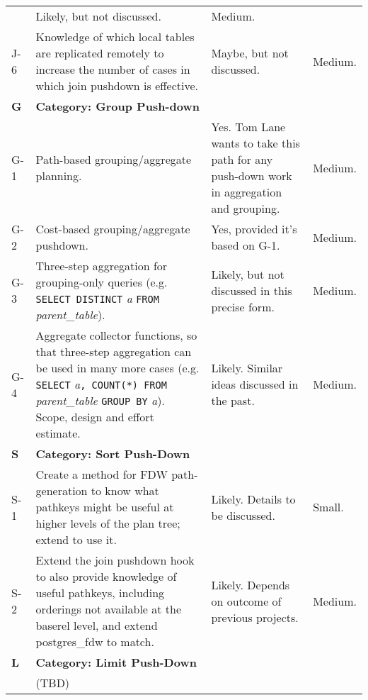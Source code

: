 \begin{longtable}{lp{0.5\hsize}p{0.2\hsize}p{0.2\hsize}}
			& \raggedright Likely, but not discussed.
			& Medium. \\
		J-6 & \raggedright
			  Knowledge of which local tables are replicated remotely to increase
			  the number of cases in which join pushdown is effective.
			& \raggedright Maybe, but not discussed.
			& Medium. \\ \hline
		\textbf{G} & \textbf{Category: Group Push-down} & & \\ \hline
		G-1 & \raggedright
			  Path-based grouping/aggregate planning.
			& \raggedright Yes. Tom Lane wants to take this path for any push-down work in
			  aggregation and grouping.
			& Medium. \\
		G-2 & \raggedright
			  Cost-based grouping/aggregate pushdown.
			& \raggedright Yes, provided it’s based on G-1.
			& Medium. \\
		G-3 & \raggedright
			  Three-step aggregation for grouping-only queries
			  (e.g.{} \texttt{SELECT DISTINCT} \textit{a} \texttt{FROM} \textit{parent\_table}).
			& \raggedright Likely, but not discussed in this precise form. 
			& Medium. \\
		G-4 & \raggedright
			  Aggregate collector functions, so that three-step aggregation can be
			  used in many more cases (e.g.{} \texttt{SELECT} \textit{a}\texttt{,
			  COUNT(*) FROM} \textit{parent\_table} \texttt{GROUP BY} \textit{a}).
			  Scope, design and effort estimate.
			& \raggedright Likely.  Similar ideas discussed in the past.
			& Medium. \\ \hline
		\textbf{S} & \textbf{Category: Sort Push-Down} & & \\ \hline
		S-1 & \raggedright
			  Create a method for FDW path-generation to know what pathkeys might be
			  useful at higher levels of the plan tree;
			  extend \file{postgresGetForeignPaths()} to use it.
			& \raggedright Likely.  Details to be discussed.
			& Small. \\
		S-2 & \raggedright
			  Extend the join pushdown hook to also provide knowledge of useful
			  pathkeys, including orderings not available at the baserel level,
			  and extend postgres\_fdw to match. 
			& \raggedright Likely.  Depends on outcome of previous projects.
			& Medium.\\ \hline
		\textbf{L} & \textbf{Category: Limit Push-Down} & & \\ \hline
		& (TBD) & & \\ \hline
	\end{longtable}




